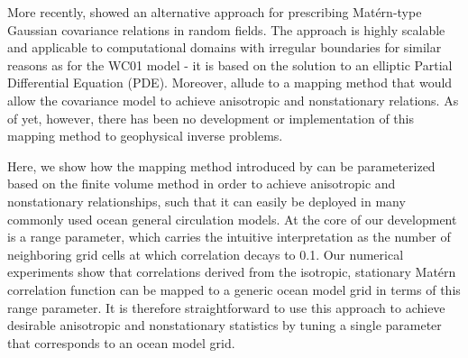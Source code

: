 %

More recently, \citet{RSSB:RSSB777} showed an alternative approach for
prescribing Mat\'ern-type Gaussian covariance relations in random fields.
The approach is highly scalable and applicable to computational domains with
irregular boundaries for similar reasons as for the WC01 model -
it is based on the solution to an elliptic Partial
Differential Equation (PDE).
Moreover, \citet{RSSB:RSSB777} allude to a mapping method that would allow the
covariance model to achieve anisotropic and nonstationary relations.
As of yet, however, there has been no development or implementation of this
mapping method to geophysical inverse problems.

Here, we show how the mapping method introduced by \citet{RSSB:RSSB777}
can be parameterized based on the finite volume method
in order to achieve anisotropic and nonstationary relationships, such that it can easily
be deployed in many commonly used ocean general circulation models.
At the core of our development is a range parameter, which carries the intuitive
interpretation as the number of neighboring grid cells at which
correlation decays to 0.1.
Our numerical experiments show that correlations derived from the isotropic,
stationary Mat\'ern correlation function can be mapped to a generic ocean model
grid in terms of this range parameter.
It is therefore straightforward to use this approach to achieve desirable
anisotropic and nonstationary statistics by tuning a single parameter that
corresponds to an ocean model grid.

